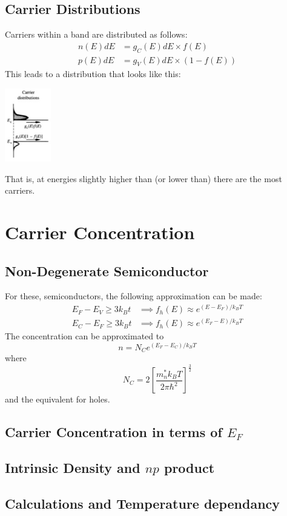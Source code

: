 \documentclass[nobib]{tufte-handout}
\begin{document}
\subsection{Carrier Distributions}
Carriers within a band are distributed as follows:
\begin{align*}
    n(E)dE &=g_C(E)dE \times f(E)\\
    p(E)dE &=g_V(E)dE \times (1-f(E))
\end{align*}
This leads to a distribution that looks like this:
\begin{center}
    \includegraphics[height = 120px]{images/carrier_distribution.png}
\end{center}
That is, at energies slightly higher than (or lower than) there are the most carriers.
\section{Carrier Concentration}
\subsection{Non-Degenerate Semiconductor}
For these, semiconductors, the following approximation can be made:
\begin{align*}
    E_F-E_V\geq 3k_B t &\implies f_h(E) \approx e^{(E-E_F)/k_B T}\\
    E_C-E_F\geq 3k_B t &\implies f_h(E) \approx e^{(E_F-E)/k_B T}
\end{align*}
The concentration can be approximated to \begin{equation*}
    n = N_C e^{(E_F-E_C)/k_B T}
\end{equation*} where \begin{equation*}
    N_C = 2 \left[\frac{m_n^* k_B T}{2 \pi \hbar^2}\right]^{\frac{3}{2}}
\end{equation*}
and the equivalent for holes.
\subsection{Carrier Concentration in terms of $E_F$}
\subsection{Intrinsic Density and $np$ product}
\subsection{Calculations and Temperature dependancy}
\end{document}
